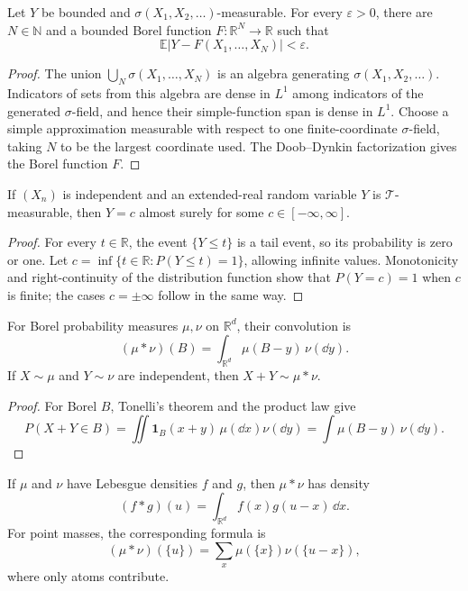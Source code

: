\begin{thm}
Let $Y$ be bounded and $\sigma(X_1,X_2,\ldots)$-measurable. For every
$\varepsilon>0$, there are $N\in\mathbb N$ and a bounded Borel function
$F:\mathbb R^N\to\mathbb R$ such that
\[
\mathbb E|Y-F(X_1,\ldots,X_N)|<\varepsilon.
\]
\end{thm}

\begin{proof}
The union $\bigcup_N\sigma(X_1,\ldots,X_N)$ is an algebra generating
$\sigma(X_1,X_2,\ldots)$. Indicators of sets from this algebra are dense in
$L^1$ among indicators of the generated $\sigma$-field, and hence their
simple-function span is dense in $L^1$. Choose a simple approximation
measurable with respect to one finite-coordinate $\sigma$-field, taking $N$
to be the largest coordinate used. The Doob--Dynkin factorization gives the
Borel function $F$.
\end{proof}

\begin{cor}
If $(X_n)$ is independent and an extended-real random variable $Y$ is
$\mathcal T$-measurable, then $Y=c$ almost surely for some
$c\in[-\infty,\infty]$.
\end{cor}

\begin{proof}
For every $t\in\mathbb R$, the event $\{Y\leq t\}$ is a tail event, so its
probability is zero or one. Let
$c=\inf\{t\in\mathbb R:P(Y\leq t)=1\}$, allowing infinite values. Monotonicity
and right-continuity of the distribution function show that
$P(Y=c)=1$ when $c$ is finite; the cases $c=\pm\infty$ follow in the same way.
\end{proof}

\begin{de}[Convolution]
For Borel probability measures $\mu,\nu$ on $\mathbb R^d$, their convolution
is
\[
(\mu*\nu)(B)=\int_{\mathbb R^d}\mu(B-y)\,\nu(\dd y).
\]
If $X\sim\mu$ and $Y\sim\nu$ are independent, then
$X+Y\sim\mu*\nu$.
\end{de}

\begin{proof}
For Borel $B$, Tonelli's theorem and the product law give
\[
P(X+Y\in B)
 =\iint\mathbf1_B(x+y)\,\mu(\dd x)\nu(\dd y)
 =\int\mu(B-y)\,\nu(\dd y).
\]
\end{proof}

\begin{prop}
If $\mu$ and $\nu$ have Lebesgue densities $f$ and $g$, then $\mu*\nu$ has
density
\[
(f*g)(u)=\int_{\mathbb R^d}f(x)g(u-x)\,\dd x.
\]
For point masses, the corresponding formula is
\[
(\mu*\nu)(\{u\})
 =\sum_x\mu(\{x\})\nu(\{u-x\}),
\]
where only atoms contribute.
\end{prop}

